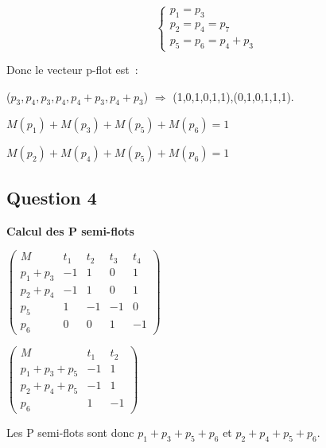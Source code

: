 \begin{equation}
\begin{cases}
p_1 = p_3 \\

p_2 = p_4 = p_7 \\

p_5 = p_6 = p_4 + p_3
\end{cases}
\end{equation}

Donc le vecteur p-flot est~: 

($p_3,p_4,p_3,p_4,p_4 + p_3,p_4 + p_3$) $\Rightarrow$
(1,0,1,0,1,1),(0,1,0,1,1,1).


$M(p_1)+M(p_3)+M(p_5)+M(p_6)=1$


$M(p_2)+M(p_4)+M(p_5)+M(p_6)=1$

\subsection*{Question 4}

\textbf{Calcul des P semi-flots}

 $ \begin{pmatrix}
M&t_1&t_2&t_3&t_4 \\
p_1+p_3& -1&1&0&1 \\
p_2+p_4&-1&1&0&1 \\
p_5&1&-1&-1&0 \\
p_6&0&0&1&-1
\end{pmatrix}$

 $ \begin{pmatrix}
M&t_1&t_2 \\
p_1+p_3+p_5& -1&1 \\
p_2+p_4+p_5&-1&1 \\
p_6&1&-1
\end{pmatrix}$

Les P semi-flots sont donc $p_1+p_3+p_5+p_6$ et $p_2+p_4+p_5+p_6$.
